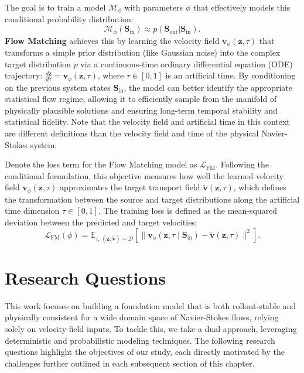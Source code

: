 The goal is to train a model $\mathcal{M}_{\phi}$ with parameters $\phi$ that effectively models this conditional probability distribution:
\begin{equation}
\mathcal{M}_{\phi}(\mathbf{S}_{\text{in}}) \approx p( \mathbf{S}_{\text{out}} | \mathbf{S}_{\text{in}}).
\end{equation}
\textbf{Flow Matching} achieves this by learning the velocity field $\mathbf{v}_{\phi}(\mathbf{z}, \tau)$ that transforms a simple prior distribution (like Gaussian noise) into the complex target distribution $p$ via a continuous-time ordinary differential equation (ODE) trajectory: $\frac{d\mathbf{z}}{d\tau} = \mathbf{v}_{\phi}(\mathbf{z}, \tau)$, where $\tau \in [0, 1]$ is an artificial time. By conditioning on the previous system states $\mathbf{S}_{\text{in}}$, the model can better identify the appropriate statistical flow regime, allowing it to efficiently sample from the manifold of physically plausible solutions and ensuring long-term temporal stability and statistical fidelity. Note that the velocity field and artificial time in this context are different definitions than the velocity field and time of the physical Navier-Stokes system.

Denote the loss term for the Flow Matching model as $\mathcal{L}_{\text{FM}}$. Following the conditional formulation, this objective measures how well the learned velocity field $\mathbf{v}_{\phi}(\mathbf{z}, \tau)$ approximates the target transport field $\tilde{\mathbf{v}}(\mathbf{z}, \tau)$, which defines the transformation between the source and target distributions along the artificial time dimension $\tau \in [0, 1]$. The training loss is defined as the mean-squared deviation between the predicted and target velocities:
\begin{equation}
	\mathcal{L}_{\text{FM}}(\phi) = 
	\mathbb{E}_{\tau,\,(\mathbf{z}, \tilde{\mathbf{v}}) \sim \mathcal{D}} 
	\left[
	\big\| 
	\mathbf{v}_{\phi}(\mathbf{z}, \tau \mid \mathbf{S}_{\text{in}}) 
	- 
	\tilde{\mathbf{v}}(\mathbf{z}, \tau)
	\big\|^2
	\right].
\end{equation}

\section{Research Questions}

This work focuses on building a foundation model that is both rollout-stable and physically consistent for a wide domain space of Navier-Stokes flows, relying solely on velocity-field inputs. To tackle this, we take a dual approach, leveraging deterministic and probabilistic modeling techniques. The following research questions highlight the objectives of our study, each directly motivated by the challenges further outlined in each subsequent section of this chapter.

